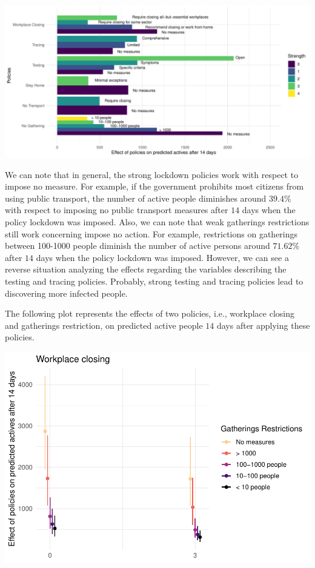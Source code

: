 \documentclass[
  6pt,
]{article}
\begin{document}
\begin{center}\includegraphics{Report_SC_Group3_files/figure-latex/unnamed-chunk-19-1} \end{center}

We can note that in general, the strong lockdown policies work with
respect to impose no measure. For example, if the government prohibits
most citizens from using public transport, the number of active people
diminishes around \(39.4\%\) with respect to imposing no public
transport measures after \(14\) days when the policy lockdown was
imposed. Also, we can note that weak gatherings restrictions still work
concerning impose no action. For example, restrictions on gatherings
between 100-1000 people diminish the number of active persons around
\(71.62\%\)after \(14\) days when the policy lockdown was imposed.
However, we can see a reverse situation analyzing the effects regarding
the variables describing the testing and tracing policies. Probably,
strong testing and tracing policies lead to discovering more infected
people.

The following plot represents the effects of two policies, i.e.,
workplace closing and gatherings restriction, on predicted active people
\(14\) days after applying these policies.

\begin{center}
	\includegraphics[width=.7\textwidth]{Report_SC_Group3_files/figure-latex/unnamed-chunk-20-1} 
\end{center}
\end{document}
